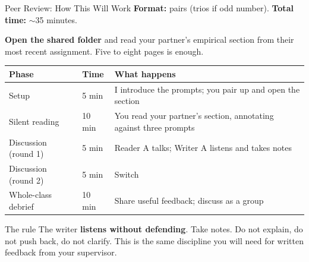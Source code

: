 \documentclass[aspectratio=169,11pt]{beamer}
\begin{document}
\begin{frame}{Peer Review: How This Will Work}
    \footnotesize
    \textbf{Format:} pairs (trios if odd number). \quad \textbf{Total time:} $\sim$35 minutes.
    \vspace{0.15cm}

    \textbf{Open the shared folder} and read your partner's empirical section from their most recent assignment. Five to eight pages is enough.
    \vspace{0.1cm}
    \begin{table}
        \scriptsize
        \begin{tabular}{lll}
            \toprule
            \textbf{Phase} & \textbf{Time} & \textbf{What happens} \\
            \midrule
            Setup & 5 min & I introduce the prompts; you pair up and open the section \\
            Silent reading & 10 min & You read your partner's section, annotating against three prompts \\
            Discussion (round 1) & 5 min & Reader A talks; Writer A listens and takes notes \\
            Discussion (round 2) & 5 min & Switch \\
            Whole-class debrief & 10 min & Share useful feedback; discuss as a group \\
            \bottomrule
        \end{tabular}
    \end{table}
    \vspace{0.1cm}
    \begin{alertblock}{The rule}
        The writer \textbf{listens without defending}. Take notes. Do not explain, do not push back, do not clarify. This is the same discipline you will need for written feedback from your supervisor.
    \end{alertblock}
\end{frame}
\end{document}
